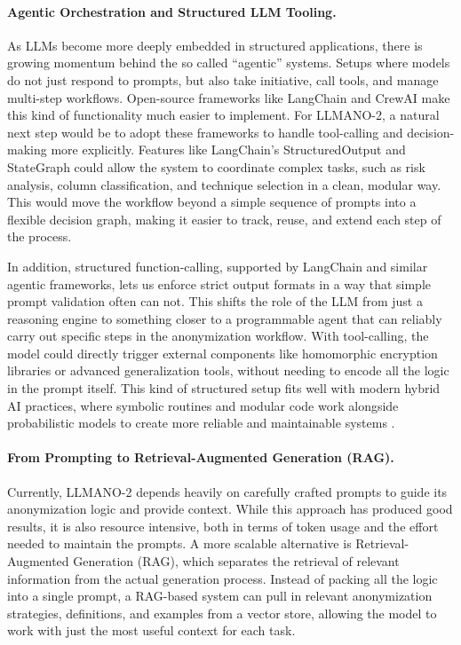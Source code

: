 \documentclass{article}
\begin{document}
\paragraph{Agentic Orchestration and Structured LLM Tooling.}
As LLMs become more deeply embedded in structured applications, there is growing momentum behind the so called “agentic” systems. Setups where models do not just respond to prompts, but also take initiative, call tools, and manage multi-step workflows. Open-source frameworks like LangChain and CrewAI make this kind of functionality much easier to implement. For LLMANO-2, a natural next step would be to adopt these frameworks to handle tool-calling and decision-making more explicitly. Features like LangChain’s StructuredOutput and StateGraph could allow the system to coordinate complex tasks, such as risk analysis, column classification, and technique selection in a clean, modular way. This would move the workflow beyond a simple sequence of prompts into a flexible decision graph, making it easier to track, reuse, and extend each step of the process.

In addition, structured function-calling, supported by LangChain and similar agentic frameworks, lets us enforce strict output formats in a way that simple prompt validation often can not. This shifts the role of the LLM from just a reasoning engine to something closer to a programmable agent that can reliably carry out specific steps in the anonymization workflow. With tool-calling, the model could directly trigger external components like homomorphic encryption libraries or advanced generalization tools, without needing to encode all the logic in the prompt itself. This kind of structured setup fits well with modern hybrid AI practices, where symbolic routines and modular code work alongside probabilistic models to create more reliable and maintainable systems \cite{jarvix}.

\paragraph{From Prompting to Retrieval-Augmented Generation (RAG).}
Currently, LLMANO-2 depends heavily on carefully crafted prompts to guide its anonymization logic and provide context. While this approach has produced good results, it is also resource intensive, both in terms of token usage and the effort needed to maintain the prompts. A more scalable alternative is Retrieval-Augmented Generation (RAG), which separates the retrieval of relevant information from the actual generation process. Instead of packing all the logic into a single prompt, a RAG-based system can pull in relevant anonymization strategies, definitions, and examples from a vector store, allowing the model to work with just the most useful context for each task.
\end{document}

